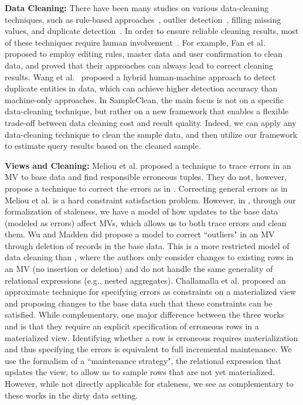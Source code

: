 {\noindent \bf Data Cleaning:} There have been many studies on various data-cleaning techniques, such as rule-based approaches~\cite{fan2012foundations,DBLP:conf/sigmod/DallachiesaEEEIOT13}, outlier detection~\cite{hellerstein2008quantitative,dasu2003exploratory}, filling missing values, and duplicate detection~\cite{conf/hdkm/Christen08, DBLP:conf/kdd/BilenkoM03, conf/sigmod/WangLF12}. In order to ensure reliable cleaning results, most of these techniques require human involvement~\cite{DBLP:journals/pvldb/YakoutENOI11,DBLP:journals/pvldb/WangKFF12,DBLP:conf/sigmod/WangLKFF13}.
For example, Fan et al.~\cite{DBLP:journals/pvldb/FanLMTY10} proposed to employ editing rules, master data and user confirmation to clean data, and proved that their approaches can always lead to correct cleaning results. Wang et al.~\cite{DBLP:journals/pvldb/WangKFF12} proposed a hybrid human-machine approach to detect duplicate entities in data, which can achieve higher detection accuracy than machine-only approaches. 
In SampleClean, the main focus is not on a specific data-cleaning technique, but rather on a new framework that enables a flexible trade-off between data cleaning cost and result quality.
Indeed, we can apply any data-cleaning technique to clean the sample data, and then utilize our framework to estimate query results based on the cleaned sample. 

\vspace{.5em}

{\noindent \bf Views and Cleaning:} Meliou et al. \cite{DBLP:conf/sigmod/MeliouGNS11} proposed a technique to trace errors in an MV to base data and find responsible erroneous tuples. 
They do not, however, propose a technique to correct the errors as in \svc.
Correcting general errors as in Meliou et al. is a hard constraint satisfaction problem.
However, in \svc, through our formalization of staleness, we have a model of how updates to the base data (modeled as errors) affect MVs, which allows us to both trace errors and clean them.
Wu and Madden \cite{DBLP:journals/pvldb/0002M13} did propose a model to correct ``outliers" in an MV through deletion of records in the base data.
This is a more restricted model of data cleaning than \svc, where the authors only consider changes to existing rows in an MV (no insertion or deletion) and do not handle the same generality of relational expressions (e.g., nested aggregates).
Challamalla et al. \cite{DBLP:conf/sigmod/ChalamallaIOP14} proposed an approximate technique for specifying errors as constraints on a materialized view and proposing changes to the base data such that these constraints can be satisfied.
While complementary, one major difference between the three works \cite{DBLP:conf/sigmod/MeliouGNS11, DBLP:journals/pvldb/0002M13, DBLP:conf/sigmod/ChalamallaIOP14} and \svc is that they require an explicit specification of erroneous rows in a materialized view.
Identifying whether a row is erroneous requires materialization and thus specifying the errors is equivalent to full incremental maintenance. 
We use the formalism of a ``maintenance strategy", the relational expression that updates the view, to allow us to sample rows that are not yet materialized.
However, while not directly applicable for staleness, we see \svc as complementary to these works in the dirty data setting. 


